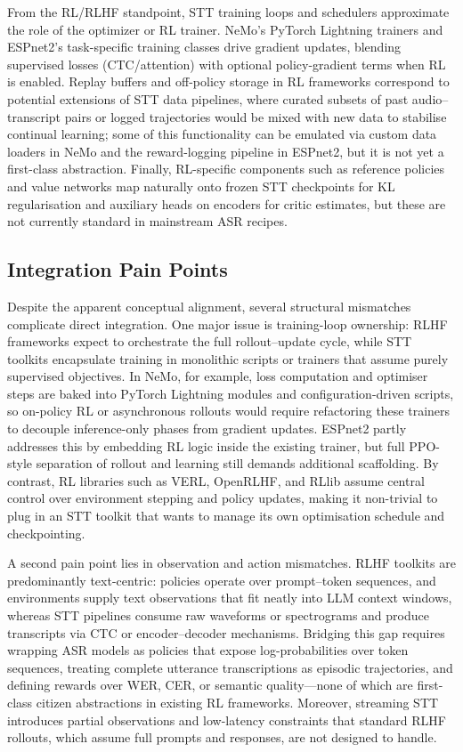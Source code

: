 \documentclass[conference]{IEEEtran}
\begin{document}
From the RL/RLHF standpoint, STT training loops and schedulers approximate the role of the optimizer or RL trainer.
NeMo’s PyTorch Lightning trainers and ESPnet2’s task-specific training classes drive gradient updates, blending supervised losses (CTC/attention) with optional policy-gradient terms when RL is enabled.
Replay buffers and off-policy storage in RL frameworks correspond to potential extensions of STT data pipelines, where curated subsets of past audio–transcript pairs or logged trajectories would be mixed with new data to stabilise continual learning; some of this functionality can be emulated via custom data loaders in NeMo and the reward-logging pipeline in ESPnet2, but it is not yet a first-class abstraction.
Finally, RL-specific components such as reference policies and value networks map naturally onto frozen STT checkpoints for KL regularisation and auxiliary heads on encoders for critic estimates, but these are not currently standard in mainstream ASR recipes.

\subsection{Integration Pain Points}

Despite the apparent conceptual alignment, several structural mismatches complicate direct integration.
One major issue is training-loop ownership: RLHF frameworks expect to orchestrate the full rollout–update cycle, while STT toolkits encapsulate training in monolithic scripts or trainers that assume purely supervised objectives.
In NeMo, for example, loss computation and optimiser steps are baked into PyTorch Lightning modules and configuration-driven scripts, so on-policy RL or asynchronous rollouts would require refactoring these trainers to decouple inference-only phases from gradient updates.
ESPnet2 partly addresses this by embedding RL logic inside the existing trainer, but full PPO-style separation of rollout and learning still demands additional scaffolding.
By contrast, RL libraries such as VERL, OpenRLHF, and RLlib assume central control over environment stepping and policy updates, making it non-trivial to plug in an STT toolkit that wants to manage its own optimisation schedule and checkpointing.

A second pain point lies in observation and action mismatches.
RLHF toolkits are predominantly text-centric: policies operate over prompt–token sequences, and environments supply text observations that fit neatly into LLM context windows, whereas STT pipelines consume raw waveforms or spectrograms and produce transcripts via CTC or encoder–decoder mechanisms.
Bridging this gap requires wrapping ASR models as policies that expose log-probabilities over token sequences, treating complete utterance transcriptions as episodic trajectories, and defining rewards over WER, CER, or semantic quality—none of which are first-class citizen abstractions in existing RL frameworks.
Moreover, streaming STT introduces partial observations and low-latency constraints that standard RLHF rollouts, which assume full prompts and responses, are not designed to handle.
\end{document}
